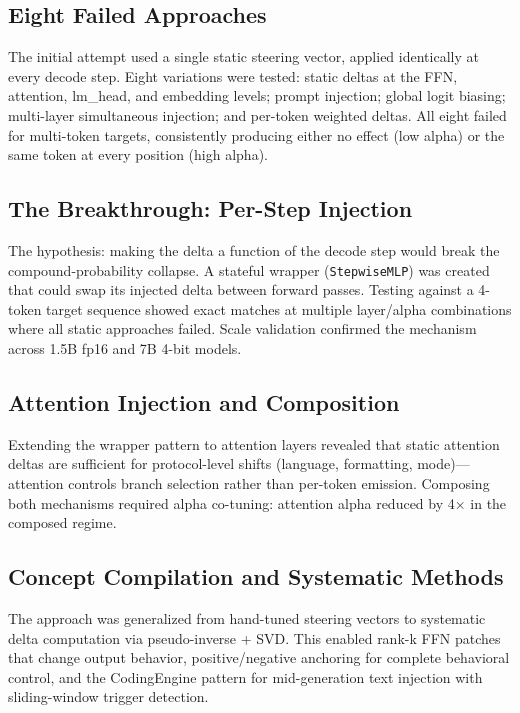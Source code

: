 \documentclass[11pt,a4paper]{article}
\begin{document}
\subsection{Eight Failed Approaches}

The initial attempt used a single static steering vector, applied identically at every decode step. Eight variations were tested: static deltas at the FFN, attention, lm\_head, and embedding levels; prompt injection; global logit biasing; multi-layer simultaneous injection; and per-token weighted deltas. All eight failed for multi-token targets, consistently producing either no effect (low alpha) or the same token at every position (high alpha).

\subsection{The Breakthrough: Per-Step Injection}

The hypothesis: making the delta a function of the decode step would break the compound-probability collapse. A stateful wrapper (\texttt{StepwiseMLP}) was created that could swap its injected delta between forward passes. Testing against a 4-token target sequence showed exact matches at multiple layer/alpha combinations where all static approaches failed. Scale validation confirmed the mechanism across 1.5B fp16 and 7B 4-bit models.

\subsection{Attention Injection and Composition}

Extending the wrapper pattern to attention layers revealed that static attention deltas are sufficient for protocol-level shifts (language, formatting, mode)---attention controls branch selection rather than per-token emission. Composing both mechanisms required alpha co-tuning: attention alpha reduced by 4× in the composed regime.

\subsection{Concept Compilation and Systematic Methods}

The approach was generalized from hand-tuned steering vectors to systematic delta computation via pseudo-inverse + SVD. This enabled rank-k FFN patches that change output behavior, positive/negative anchoring for complete behavioral control, and the CodingEngine pattern for mid-generation text injection with sliding-window trigger detection.
\end{document}
